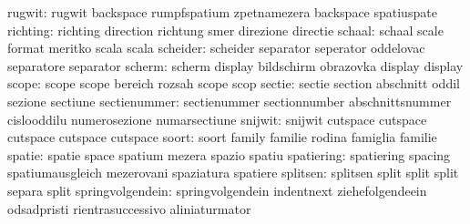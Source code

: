                    rugwit: rugwit                    backspace
                           rumpfspatium              zpetnamezera
                           backspace                 spatiuspate %
                 richting: richting                  direction
                           richtung                  smer
                           direzione                 directie
                   schaal: schaal                    scale
                           format                    meritko
                           scala                     scala
                 scheider: scheider                  separator
                           seperator                 oddelovac
                           separatore                separator
                   scherm: scherm                    display
                           bildschirm                obrazovka
                           display                   display %
                    scope: scope                     scope
                           bereich                   rozsah
                           scope                     scop %
                   sectie: sectie                    section
                           abschnitt                 oddil
                           sezione                   sectiune
             sectienummer: sectienummer              sectionnumber
                           abschnittsnummer          cislooddilu
                           numerosezione             numarsectiune
                  snijwit: snijwit                   cutspace
                           cutspace                  cutspace
                           cutspace                  cutspace %
                    soort: soort                     family
                           familie                   rodina
                           famiglia                  familie
                   spatie: spatie                    space
                           spatium                   mezera
                           spazio                    spatiu
               spatiering: spatiering                spacing
                           spatiumausgleich          mezerovani
                           spaziatura                spatiere
                 splitsen: splitsen                  split
                           split                     split
                           separa                    split %
         springvolgendein: springvolgendein          indentnext
                           ziehefolgendeein          odsadpristi
                           rientrasuccessivo         aliniaturmator
